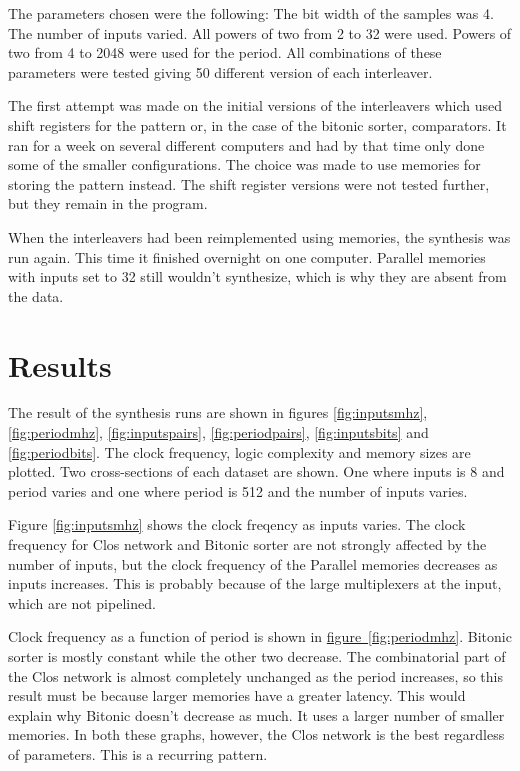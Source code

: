 \documentclass[
	utf8,
	largesmallcaps,
	intlimits,
	widermath,
	sharecounter,
	nobreak,
	definition=marks,
	numbers,
	noparts
]{rtthesis}
\newcommand{\figureref}[1]{\hyperref[#1]{figure~\ref*{#1}}}
\newcommand{\Hypref}[1]{\hyperref[#1]{\ref*{#1}}}
\begin{document}
The parameters chosen were the following: The bit width of the samples was 4.
The number of inputs varied. All powers of two from 2 to 32 were used. Powers
of two from 4 to 2048 were used for the period. All combinations of these
parameters were tested giving 50 different version of each interleaver.

The first attempt was made on the initial versions of the interleavers which
used shift registers for the pattern or, in the case of the bitonic sorter,
comparators. It ran for a week on several different computers and had by that
time only done some of the smaller configurations. The choice was made to use
memories for storing the pattern instead. The shift register versions were not
tested further, but they remain in the program.

When the interleavers had been reimplemented using memories, the synthesis was
run again. This time it finished overnight on one computer. Parallel memories
with inputs set to 32 still wouldn't synthesize, which is why they are absent
from the data.

\section{Results}

The result of the synthesis runs are shown in figures \Hypref{fig:inputsmhz},
\Hypref{fig:periodmhz}, \Hypref{fig:inputspairs}, \Hypref{fig:periodpairs},
\Hypref{fig:inputsbits} and \Hypref{fig:periodbits}. The clock frequency, logic
complexity and memory sizes are plotted. Two cross-sections of each dataset are
shown. One where inputs is 8 and period varies and one where period is 512 and
the number of inputs varies.

Figure \ref{fig:inputsmhz} shows the clock freqency as inputs varies. The clock
frequency for Clos network and Bitonic sorter are not strongly affected by the
number of inputs, but the clock frequency of the Parallel memories decreases as
inputs increases. This is probably because of the large multiplexers at the
input, which are not pipelined.

Clock frequency as a function of period is shown in \figureref{fig:periodmhz}.
Bitonic sorter is mostly constant while the other two decrease. The
combinatorial part of the Clos network is almost completely unchanged as the
period increases, so this result must be because larger memories have a greater
latency. This would explain why Bitonic doesn't decrease as much. It uses a
larger number of smaller memories. In both these graphs, however, the Clos
network is the best regardless of parameters. This is a recurring pattern.
\end{document}
